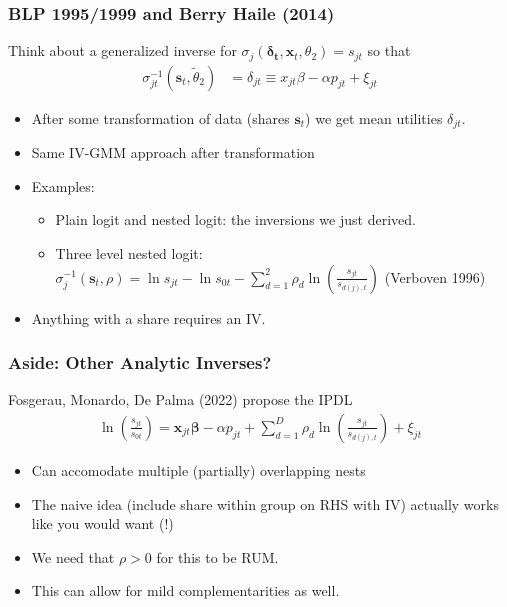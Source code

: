 \documentclass[aspectratio=169,10pt]{beamer}
\begin{document}
\begin{frame}
\frametitle{BLP 1995/1999 and Berry Haile (2014)}
Think about a \alert{generalized inverse} for $\sigma_{j}(\symbf{\delta_{t}}, \symbf{x}_t,\theta_2) = s_{jt}$ so that 
\begin{align*}
 \sigma_{jt}^{-1}(\symbf{s}_t,\widetilde{\theta}_2)&= \delta_{jt} \equiv x_{jt} \beta -\alpha p_{jt} +  \xi_{jt} 
\end{align*}
 \begin{itemize}
\item After some transformation of data (shares $\symbf{s}_t$) we get \alert{mean utilities} $\delta_{jt}$.
\item Same IV-GMM approach after transformation
\item Examples:
\begin{itemize}
\item Plain logit and nested logit: the inversions we just derived.
\item Three level nested logit: $\sigma_{j}^{-1}(\symbf{s}_t,\rho) = \ln s_{jt}- \ln s_{0t} -\sum_{d=1}^2 \rho_d \ln \left(\frac{s_{j t}}{s_{d(j), t}}\right)$ (Verboven 1996)
 \end{itemize}
 \item Anything with a share requires an IV.
 \end{itemize}
\end{frame}


\begin{frame}
\frametitle{Aside: Other Analytic Inverses?}
Fosgerau, Monardo, De Palma (2022) propose the IPDL
\begin{align*}
\ln \left(\frac{s_{j t}}{s_{0 t}}\right)=\symbf{x}_{j t} \symbf{\beta}-\alpha p_{j t}+\sum_{d=1}^D \rho_d \ln \left(\frac{s_{j t}}{s_{d(j), t}}\right)+\xi_{j t}
\end{align*}
 \begin{itemize}
\item Can accomodate multiple (partially) overlapping nests
\item The naive idea (include share within group on RHS with IV) actually works like you would want (!)
\item We need that $\rho > 0$ for this to be RUM.
\item This can allow for mild complementarities as well.
 \end{itemize}
\end{frame}
\end{document}
